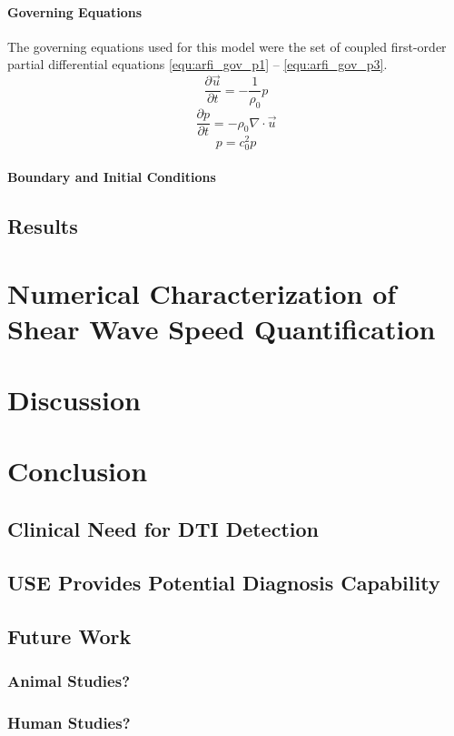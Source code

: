 \documentclass[12pt]{book}
\begin{document}
			\subsubsection{Governing Equations}
				The governing equations used for this model were the set of coupled first-order partial differential equations \ref{equ:arfi_gov_p1} -- \ref{equ:arfi_gov_p3}.
				\begin{equation}
					\label{equ:arfi_gov_p1}
					\frac{\partial \vec{u}}{\partial t} = - \frac{1}{\rho_0} p
				\end{equation}
				\begin{equation}
					\label{equ:arfi_gov_p2}
					\frac{\partial p}{\partial t} = - \rho_0 \nabla \cdot \vec{u}
				\end{equation}
				\begin{equation}
					\label{equ:arfi_gov_p3}
					p = c_0^2 p
				\end{equation}

			\subsubsection{Boundary and Initial Conditions}
	\section{Results}

\chapter{Numerical Characterization of Shear Wave Speed Quantification}

\chapter{Discussion}

\chapter{Conclusion}
	\section{Clinical Need for DTI Detection}
	\section{USE Provides Potential Diagnosis Capability}
	\section{Future Work}
		\subsection{Animal Studies?}
		\subsection{Human Studies?}



\end{document}
